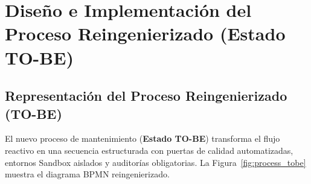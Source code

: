 \documentclass[12pt]{article}
\begin{document}
\section{Diseño e Implementación del Proceso Reingenierizado (Estado TO-BE)}

\subsection{Representación del Proceso Reingenierizado (TO-BE)}
El nuevo proceso de mantenimiento (\textbf{Estado TO-BE}) transforma el flujo reactivo en una secuencia estructurada con puertas de calidad automatizadas, entornos Sandbox aislados y auditorías obligatorias. La Figura~\ref{fig:process_tobe} muestra el diagrama BPMN reingenierizado.
\end{document}
